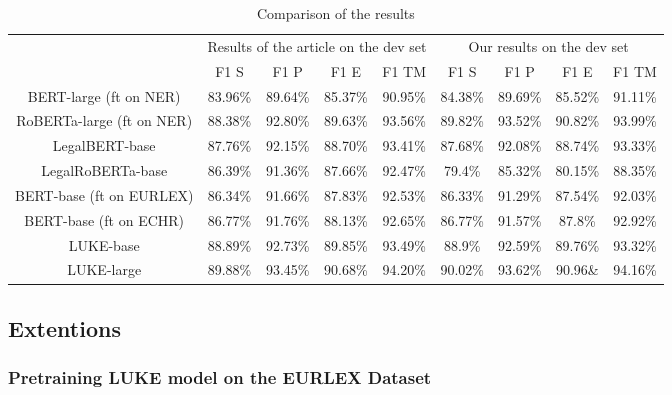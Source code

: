 \documentclass{article}
\begin{document}
\begin{table}[h!]
\centering
\begin{tabular}{||c|| c | c | c | c ||c | c | c | c ||} 

 \hline
 \multirow{2}{10em}{\centering{Models}} & \multicolumn{4}{|c||}{Results of the article on the dev set} & \multicolumn{4}{|c||}{Our results on the dev set} \\
  &F1 S& F1 P & F1 E & F1 TM & F1 S& F1 P& F1 E& F1 TM\\
 \hline
 BERT-large (ft on NER)& 83.96\% & 89.64\%& 85.37\%&  90.95\%&	84.38\%	&89.69\%&	85.52\%&	91.11\%\\ [0.5ex] 
 \hline
 RoBERTa-large (ft on NER)& 88.38\% &92.80\% & 89.63\%& 93.56\%&	89.82\%&	93.52\%	&90.82\%&	93.99\%\\
 \hline
LegalBERT-base& 87.76\%& 92.15\% & 88.70\% & 93.41\% &	87.68\%	&92.08\%	&88.74\%	&93.33\%\\
\hline
LegalRoBERTa-base& 86.39\% & 91.36\%& 87.66\%&92.47\% &	79.4\%	&85.32\%	&80.15\%	&88.35\%\\
\hline
BERT-base (ft on EURLEX)& 86.34\% & 91.66\%& 87.83\%& 92.53\% &	86.33\%&	91.29\%&	87.54\%&	92.03\%\\
\hline
BERT-base (ft on ECHR)& 86.77\% & 91.76\%& 88.13\%& 92.65\%&	86.77\%&	91.57\%&	87.8\%&	92.92\%\\
\hline
LUKE-base& 88.89\% & 92.73\%& 89.85\% & 93.49\%&	88.9\%&	92.59\%&	89.76\%&	93.32\%\\
\hline
LUKE-large	& 89.88\% & 93.45\% & 90.68\% & 94.20\%& 90.02\%& 93.62\%& 90.96\& & 94.16\%  \\	
\hline
\end{tabular}
\label{tab:Comp_base}
\caption{Comparison of the results}
\end{table}

\subsection{Extentions}

\subsubsection{Pretraining LUKE model on the EURLEX Dataset}
\end{document}
